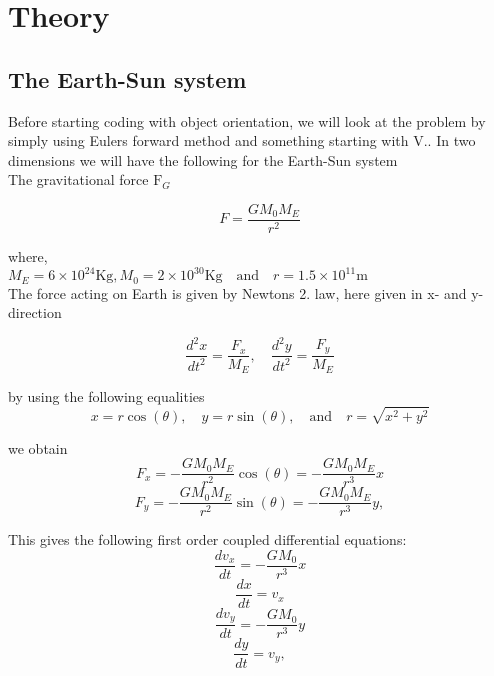 \documentclass[../main.tex]{subfiles}
\begin{document}
\section{Theory}\label{theory}
\subsection{The Earth-Sun system}
Before starting coding with object orientation, we will look at the problem by simply using Eulers forward method and something starting with V..
In two dimensions we will have the following for the Earth-Sun system \\

The gravitational force  $\text{F}_G$

\begin{equation}
  F = \frac{GM_0M_E}{r^2}
\end{equation}

where,\\

$M_E = 6\times 10^{24}\text{Kg},  M_0 = 2\times 10^{30}\text{Kg} \quad \text{and}\quad  r = 1.5\times 10^{11}\text{m}$\\


The force acting on Earth is given by Newtons 2. law, here given in x- and y- direction

$$ \frac{d^2x}{dt^2} = \frac{F_x}{M_E}, \quad \frac{d^2y}{dt^2} = \frac{F_y}{M_E}$$

by using the following equalities $$x = r \cos(\theta),\quad  y = r\sin(\theta), \quad \text{and}\quad r = \sqrt{x^2 +y^2}$$

we obtain\\

\begin{equation}
  F_x = - \frac{GM_0M_E}{r^2} \cos(\theta) =- \frac{GM_0M_E}{r^3}x
\end{equation}
\begin{equation}
  F_y = - \frac{GM_0M_E}{r^2}\sin(\theta) =- \frac{GM_0M_E}{r^3}y,
\end{equation}

This gives the following first order  coupled differential equations:
\begin{equation}
  \frac{dv_x}{dt} = - \frac{GM_0}{r^3}x
\end{equation}
\begin{equation}
  \frac{dx}{dt} = v_x
\end{equation}
\begin{equation}
  \frac{dv_y}{dt} = - \frac{GM_0}{r^3}y
\end{equation}
\begin{equation}
  \frac{dy}{dt} = v_y,
\end{equation}
\end{document}

